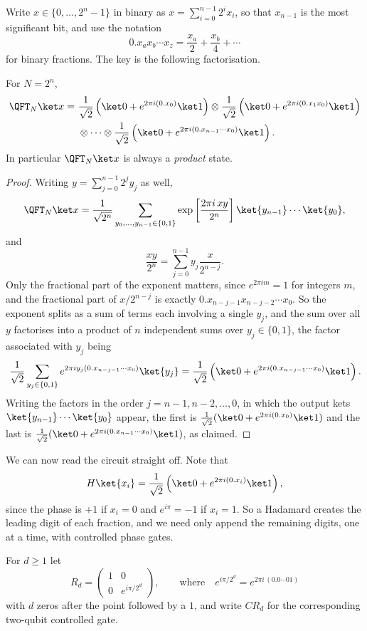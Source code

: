 Write $x\in\{0,\dots,2^n-1\}$ in binary as $x = \sum_{i=0}^{n-1}2^ix_i$, so that $x_{n-1}$ is the most significant bit, and use the notation
$$0.x_ax_b\cdots x_z = \frac{x_a}{2}+\frac{x_b}{4}+\cdots$$
for binary fractions. The key is the following factorisation.

\begin{proposition}
	For $N = 2^n$,
	\begin{align*}
		\QFT_N\ket x = \ &\frac{1}{\sqrt2}\left(\ket0 + e^{2\pi i(0.x_0)}\ket1\right)\otimes\frac1{\sqrt2}\left(\ket0+e^{2\pi i(0.x_1x_0)}\ket1\right)\\
		&\otimes\cdots\otimes\frac1{\sqrt2}\left(\ket0+e^{2\pi i(0.x_{n-1}\cdots x_0)}\ket1\right).
	\end{align*}
	In particular $\QFT_N\ket x$ is always a \emph{product} state.
\end{proposition}

\begin{proof}
	Writing $y = \sum_{j=0}^{n-1}2^jy_j$ as well,
	$$\QFT_N\ket x = \frac1{\sqrt{2^n}}\sum_{y_0,\dots,y_{n-1}\in\{0,1\}}\exp\left[\frac{2\pi i\,xy}{2^n}\right]\ket{y_{n-1}}\cdots\ket{y_0},$$
	and
	$$\frac{xy}{2^n} = \sum_{j=0}^{n-1}y_j\frac{x}{2^{n-j}}.$$
	Only the fractional part of the exponent matters, since $e^{2\pi i m} = 1$ for integers $m$, and the fractional part of $x/2^{n-j}$ is exactly $0.x_{n-j-1}x_{n-j-2}\cdots x_0$. So the exponent splits as a sum of terms each involving a single $y_j$, and the sum over all $y$ factorises into a product of $n$ independent sums over $y_j\in\{0,1\}$, the factor associated with $y_j$ being
	$$\frac1{\sqrt2}\sum_{y_j\in\{0,1\}}e^{2\pi iy_j(0.x_{n-j-1}\cdots x_0)}\ket{y_j} = \frac1{\sqrt2}\left(\ket0+e^{2\pi i(0.x_{n-j-1}\cdots x_0)}\ket1\right).$$
	Writing the factors in the order $j = n-1, n-2,\dots,0$, in which the output kets $\ket{y_{n-1}}\cdots\ket{y_0}$ appear, the first is $\tfrac1{\sqrt2}(\ket0+e^{2\pi i(0.x_0)}\ket1)$ and the last is $\tfrac1{\sqrt2}(\ket0+e^{2\pi i(0.x_{n-1}\cdots x_0)}\ket1)$, as claimed.
\end{proof}

We can now read the circuit straight off. Note that
$$H\ket{x_i} = \frac1{\sqrt2}\left(\ket0+e^{2\pi i(0.x_i)}\ket1\right),$$
since the phase is $+1$ if $x_i = 0$ and $e^{i\pi} = -1$ if $x_i = 1$. So a Hadamard creates the leading digit of each fraction, and we need only append the remaining digits, one at a time, with controlled phase gates.

\begin{definition}
	For $d\geq1$ let
	$$R_d = \begin{pmatrix} 1 & 0 \\ 0 & e^{i\pi/2^d}\end{pmatrix}, \qquad\text{where}\quad e^{i\pi/2^d} = e^{2\pi i\,(0.0\cdots01)}$$
	with $d$ zeros after the point followed by a $1$, and write $CR_d$ for the corresponding two-qubit controlled gate.
\end{definition}


